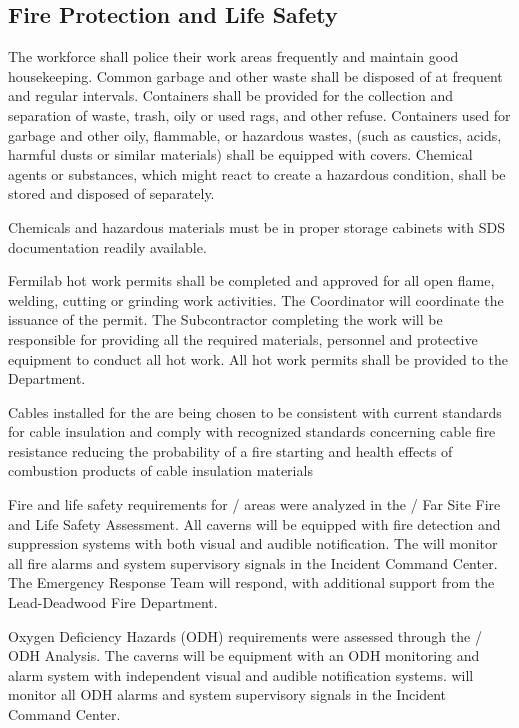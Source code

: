 \subsection{Fire Protection and Life Safety}

The workforce shall police their work areas frequently and maintain
good housekeeping. Common garbage and other waste shall be disposed of
at frequent and regular intervals. Containers shall be provided for
the collection and separation of waste, trash, oily or used rags, and
other refuse.  Containers used for garbage and other oily, flammable,
or hazardous wastes, (such as caustics, acids, harmful dusts or
similar materials) shall be equipped with covers.  Chemical agents or
substances, which might react to create a hazardous condition, shall
be stored and disposed of separately.

Chemicals and hazardous materials must be in proper storage cabinets
with SDS documentation readily available.

Fermilab hot work permits shall be completed and approved for all open
flame, welding, cutting or grinding work activities.  The 
 Coordinator will coordinate the issuance of the permit.
The Subcontractor completing the work will be responsible for
providing all the required materials, personnel and protective
equipment to conduct all hot work. All hot work permits shall be
provided to the \surf {} Department.

Cables installed for the  are being chosen to be
consistent with current \fnal standards for cable insulation and
comply with recognized standards concerning cable fire resistance
reducing the probability of a fire starting and health effects of
combustion products of cable insulation materials

Fire and life safety requirements for / areas
were analyzed in the / Far Site Fire and Life
Safety Assessment. All caverns will be equipped with fire detection
and suppression systems with both visual and audible notification. The
\surf will monitor all fire alarms and system supervisory signals in
the \surf Incident Command Center.  The \surf Emergency Response Team
will respond, with additional support from the Lead-Deadwood Fire
Department.

Oxygen Deficiency Hazards (ODH) requirements were assessed through the
/ ODH Analysis. The caverns will be equipment
with an ODH monitoring and alarm system with independent visual and
audible notification systems. \surf will monitor all ODH alarms and
system supervisory signals in the \surf Incident Command Center.

